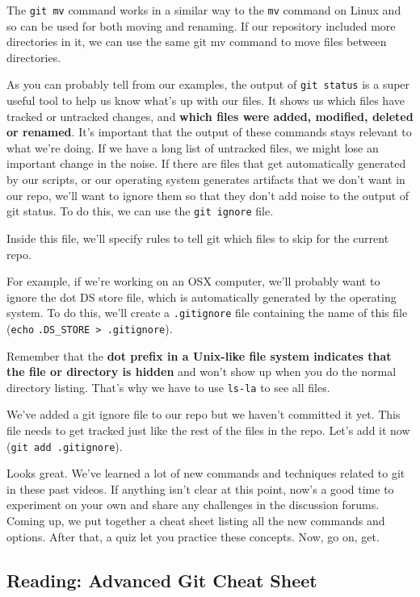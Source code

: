	The \texttt{git mv} command works in a similar way to the \texttt{mv} command on Linux and so can be used for both moving and renaming. If our repository included more directories in it, we can use the same git mv command to move files between directories.
	
	As you can probably tell from our examples, the output of \texttt{git status} is a super useful tool to help us know what's up with our files. It shows us which files have tracked or untracked changes, and \textbf{which files were added, modified, deleted or renamed}. It's important that the output of these commands stays relevant to what we're doing. If we have a long list of untracked files, we might lose an important change in the noise. If there are files that get automatically generated by our scripts, or our operating system generates artifacts that we don't want in our repo, we'll want to ignore them so that they don't add noise to the output of git status. To do this, we can use the \texttt{git ignore} file.
	
	Inside this file, we'll specify rules to tell git which files to skip for the current repo.
	
	For example, if we're working on an OSX computer, we'll probably want to ignore the dot DS store file, which is automatically generated by the operating system. To do this, we'll create a \verb|.gitignore| file containing the name of this file (\texttt{echo} \verb|.DS_STORE > .gitignore|).
	
	Remember that the \textbf{dot prefix in a Unix-like file system indicates that the file or directory is hidden} and won't show up when you do the normal directory listing. That's why we have to use \verb|ls-la| to see all files.
	
	We've added a git ignore file to our repo but we haven't committed it yet. This file needs to get tracked just like the rest of the files in the repo. Let's add it now (\verb|git add .gitignore|).
	
	Looks great. We've learned a lot of new commands and techniques related to git in these past videos. If anything isn't clear at this point, now's a good time to experiment on your own and share any challenges in the discussion forums. Coming up, we put together a cheat sheet listing all the new commands and options. After that, a quiz let you practice these concepts. Now, go on, get.
	
	\subsection{Reading: Advanced Git Cheat Sheet}
	
